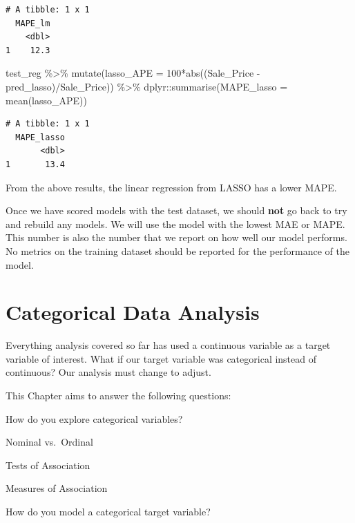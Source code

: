 \documentclass[
  letterpaper,
  DIV=11,
  numbers=noendperiod]{scrreprt}
\newenvironment{Shaded}{\begin{snugshade}}{\end{snugshade}}
\newcommand{\AttributeTok}[1]{\textcolor[rgb]{0.40,0.45,0.13}{#1}}
\newcommand{\DecValTok}[1]{\textcolor[rgb]{0.68,0.00,0.00}{#1}}
\newcommand{\FunctionTok}[1]{\textcolor[rgb]{0.28,0.35,0.67}{#1}}
\newcommand{\NormalTok}[1]{\textcolor[rgb]{0.00,0.23,0.31}{#1}}
\newcommand{\SpecialCharTok}[1]{\textcolor[rgb]{0.37,0.37,0.37}{#1}}
\begin{document}
\begin{verbatim}
# A tibble: 1 x 1
  MAPE_lm
    <dbl>
1    12.3
\end{verbatim}

\begin{Shaded}
\begin{Highlighting}[]
\NormalTok{test\_reg }\SpecialCharTok{\%\textgreater{}\%}
  \FunctionTok{mutate}\NormalTok{(}\AttributeTok{lasso\_APE =} \DecValTok{100}\SpecialCharTok{*}\FunctionTok{abs}\NormalTok{((Sale\_Price }\SpecialCharTok{{-}}\NormalTok{ pred\_lasso)}\SpecialCharTok{/}\NormalTok{Sale\_Price)) }\SpecialCharTok{\%\textgreater{}\%}
\NormalTok{  dplyr}\SpecialCharTok{::}\FunctionTok{summarise}\NormalTok{(}\AttributeTok{MAPE\_lasso =} \FunctionTok{mean}\NormalTok{(lasso\_APE))}
\end{Highlighting}
\end{Shaded}

\begin{verbatim}
# A tibble: 1 x 1
  MAPE_lasso
       <dbl>
1       13.4
\end{verbatim}

From the above results, the linear regression from LASSO has a lower
MAPE.

Once we have scored models with the test dataset, we should \textbf{not}
go back to try and rebuild any models. We will use the model with the
lowest MAE or MAPE. This number is also the number that we report on how
well our model performs. No metrics on the training dataset should be
reported for the performance of the model.


\hypertarget{sec-cat}{%
\chapter{Categorical Data Analysis}\label{sec-cat}}

Everything analysis covered so far has used a continuous variable as a
target variable of interest. What if our target variable was categorical
instead of continuous? Our analysis must change to adjust.

This Chapter aims to answer the following questions:

How do you explore categorical variables?

Nominal vs.~Ordinal

Tests of Association

Measures of Association

How do you model a categorical target variable?
\end{document}
